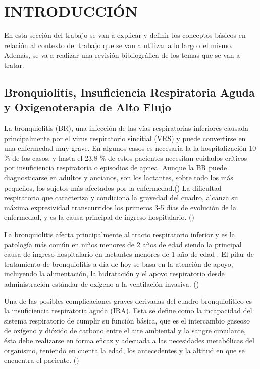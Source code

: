 \section{INTRODUCCIÓN}\label{sec:introduction}

En esta sección del trabajo se van a explicar y definir los conceptos básicos en relación al contexto del trabajo que se van a utilizar a lo largo del mismo. Además, se va a realizar una revisión bibliográfica de los temas que se van a tratar.

\subsection{Bronquiolitis, Insuficiencia Respiratoria Aguda y Oxigenoterapia de Alto Flujo}

La bronquiolitis (BR), una infección de las vías respiratorias inferiores causada principalmente por el virus respiratorio sincitial (VRS) y puede convertirse en una enfermedad muy grave. En algunos casos es necesaria la la hospitalización 10 \% de los casos, y hasta el 23,8 \% de estos pacientes necesitan cuidados críticos por insuficiencia respiratoria o episodios de apnea. Aunque la BR puede diagnosticarse en adultos y ancianos, son los lactantes, sobre todo los más pequeños, los sujetos más afectados por la enfermedad.(\cite{Fainardi2021}) La dificultad respiratoria que caracteriza y condiciona la gravedad del cuadro, alcanza su máxima expresividad transcurridos los primeros 3-5 días de evolución de la enfermedad, y es la causa principal de ingreso hospitalario. (\cite{Patel2003})

La bronquiolitis afecta principalmente al tracto respiratorio inferior y es la patología más común en niños menores de 2 años de edad siendo la principal causa de ingreso hospitalario en lactantes menores de 1 año de edad . El pilar de tratamiento de bronquiolitis a día de hoy se basa en la atención de apoyo, incluyendo la alimentación, la hidratación y el apoyo respiratorio desde administración estándar de oxígeno a la ventilación invasiva. (\cite{Daverio2019})

Una de las posibles complicaciones graves derivadas del cuadro bronquiolítico es la insuficiencia respiratoria aguda (IRA). Esta se define como la incapacidad del sistema respiratorio de cumplir su función básica, que es el intercambio gaseoso de oxígeno y dióxido de carbono entre el aire ambiental y la sangre circulante, ésta debe realizarse en forma eficaz y adecuada a las necesidades metabólicas del organismo, teniendo en cuenta la edad, los antecedentes y la altitud en que se encuentra el paciente. (\cite{FernandoR2010})  

